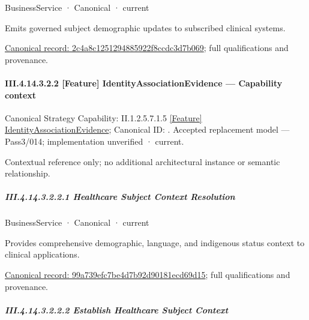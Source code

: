 \label{element:2c4a8c1251294885922f8ccdc3d7b069}
{\small BusinessService · Canonical · current}\par

Emits governed subject demographic updates to subscribed clinical systems.


{\footnotesize \href{../../../../../../../../continuum/business/business-service/2c4a8c1251294885922f8ccdc3d7b069.md}{Canonical record: 2c4a8c1251294885922f8ccdc3d7b069}; full qualifications and provenance.}\par
\paragraph*{III.4.14.3.2.2 [Feature] IdentityAssociationEvidence — Capability context}
\label{navigation:III.4.14.3.2.2}

{\small Canonical Strategy Capability: II.1.2.5.7.1.5 \hyperref[element:4389056525db482a8463e1f79bda5266]{[Feature] IdentityAssociationEvidence}; Canonical ID: \texttt{}. Accepted replacement model — Pass3/014; implementation unverified · current.}\par
Contextual reference only; no additional architectural instance or semantic relationship.\par
\subparagraph*{III.4.14.3.2.2.1 Healthcare Subject Context Resolution}
\label{navigation:III.4.14.3.2.2.1}

\label{element:99a739efc7be4d7b92d90181ecd69d15}
{\small BusinessService · Canonical · current}\par

Provides comprehensive demographic, language, and indigenous status context to clinical applications.


{\footnotesize \href{../../../../../../../../continuum/business/business-service/99a739efc7be4d7b92d90181ecd69d15.md}{Canonical record: 99a739efc7be4d7b92d90181ecd69d15}; full qualifications and provenance.}\par
\subparagraph*{III.4.14.3.2.2.2 Establish Healthcare Subject Context}
\label{navigation:III.4.14.3.2.2.2}

